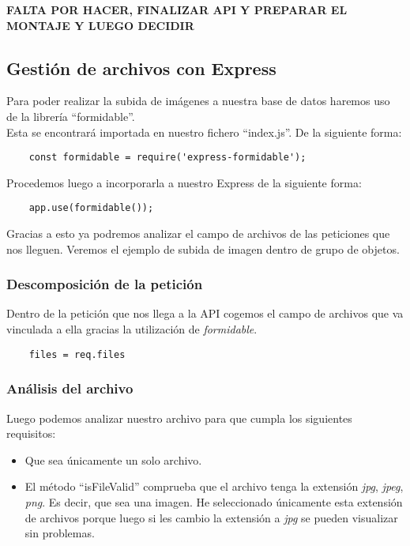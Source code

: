 \textbf{FALTA POR HACER, FINALIZAR API Y PREPARAR EL MONTAJE Y LUEGO DECIDIR}

\subsection{Gestión de archivos con Express}

Para poder realizar la subida de imágenes a nuestra base de datos haremos uso de la librería ``formidable''.
\\Esta se encontrará importada en nuestro fichero ``index.js''. De la siguiente forma:

\begin{verbatim}
    const formidable = require('express-formidable');
\end{verbatim}

Procedemos luego a incorporarla a nuestro Express de la siguiente forma:

\begin{verbatim}
    app.use(formidable());
\end{verbatim}

Gracias a esto ya podremos analizar el campo de archivos de las peticiones que nos lleguen. Veremos el ejemplo de subida de imagen dentro de grupo de objetos.

\subsubsection{Descomposición de la petición}
Dentro de la petición que nos llega a la API cogemos el campo de archivos que va vinculada a ella gracias la utilización de \textit{formidable}.
\begin{verbatim}
    files = req.files
\end{verbatim}

\subsubsection{Análisis del archivo}
Luego podemos analizar nuestro archivo para que cumpla los siguientes requisitos:
\begin{itemize}
    \item Que sea únicamente un solo archivo.
    \item El método ``isFileValid'' comprueba que el archivo tenga la extensión \textit{jpg}, \textit{jpeg}, \textit{png}. Es decir, que sea una imagen. He seleccionado únicamente esta extensión de archivos porque luego si les cambio la extensión a \textit{jpg} se pueden visualizar sin problemas.
\end{itemize}

